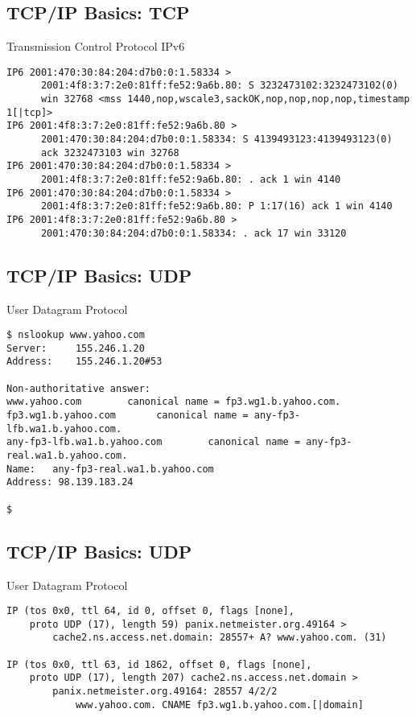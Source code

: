 \documentclass[xga]{xdvislides}
\begin{document}
\subsection{TCP/IP Basics: TCP}
\begin{center}
Transmission Control Protocol IPv6
\end{center}
\vspace{.2in}
\begin{verbatim}
IP6 2001:470:30:84:204:d7b0:0:1.58334 >
      2001:4f8:3:7:2e0:81ff:fe52:9a6b.80: S 3232473102:3232473102(0)
      win 32768 <mss 1440,nop,wscale3,sackOK,nop,nop,nop,nop,timestamp 1[|tcp]>
IP6 2001:4f8:3:7:2e0:81ff:fe52:9a6b.80 >
      2001:470:30:84:204:d7b0:0:1.58334: S 4139493123:4139493123(0)
      ack 3232473103 win 32768
IP6 2001:470:30:84:204:d7b0:0:1.58334 >
      2001:4f8:3:7:2e0:81ff:fe52:9a6b.80: . ack 1 win 4140
IP6 2001:470:30:84:204:d7b0:0:1.58334 >
      2001:4f8:3:7:2e0:81ff:fe52:9a6b.80: P 1:17(16) ack 1 win 4140
IP6 2001:4f8:3:7:2e0:81ff:fe52:9a6b.80 >
      2001:470:30:84:204:d7b0:0:1.58334: . ack 17 win 33120
\end{verbatim}


\subsection{TCP/IP Basics: UDP}
\begin{center}
User Datagram Protocol
\end{center}
\vspace{.2in}
\begin{verbatim}
$ nslookup www.yahoo.com
Server:		155.246.1.20
Address:	155.246.1.20#53

Non-authoritative answer:
www.yahoo.com        canonical name = fp3.wg1.b.yahoo.com.
fp3.wg1.b.yahoo.com       canonical name = any-fp3-lfb.wa1.b.yahoo.com.
any-fp3-lfb.wa1.b.yahoo.com        canonical name = any-fp3-real.wa1.b.yahoo.com.
Name:	any-fp3-real.wa1.b.yahoo.com
Address: 98.139.183.24

$
\end{verbatim}

\subsection{TCP/IP Basics: UDP}
\begin{center}
User Datagram Protocol
\end{center}
\vspace{.2in}
\begin{verbatim}
IP (tos 0x0, ttl 64, id 0, offset 0, flags [none],
    proto UDP (17), length 59) panix.netmeister.org.49164 >
        cache2.ns.access.net.domain: 28557+ A? www.yahoo.com. (31)

IP (tos 0x0, ttl 63, id 1862, offset 0, flags [none],
    proto UDP (17), length 207) cache2.ns.access.net.domain >
        panix.netmeister.org.49164: 28557 4/2/2
            www.yahoo.com. CNAME fp3.wg1.b.yahoo.com.[|domain]
\end{verbatim}
\end{document}
